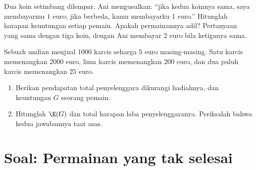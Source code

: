 \begin{exercise}[$\star\star$]\label{exo:g11:prob:10}
Dua koin setimbang dilempar. Ani mengusulkan: ``jika kedua koinnya sama, saya
membayarmu $1$ euro; jika berbeda, kamu membayarku $1$ euro.'' Hitunglah harapan
keuntungan setiap pemain. Apakah permainannya adil? Pertanyaan yang sama dengan
tiga koin, dengan Ani membayar $2$ euro bila ketiganya sama.
\end{exercise}

\begin{exercise}[$\star\star\star$]\label{exo:g11:prob:11}
Sebuah undian menjual $1000$ karcis seharga $5$ euro masing-masing. Satu karcis
memenangkan $2000$ euro, lima karcis memenangkan $200$ euro, dan dua puluh
karcis memenangkan $25$ euro.
\begin{enumerate}
  \item Berikan  pendapatan total penyelenggara dikurangi
        hadiahnya, dan  keuntungan $G$ seorang pemain.
  \item Hitunglah $\E(G)$ dan total harapan laba penyelenggaranya.
        Periksalah bahwa kedua jawabannya taat asas.
\end{enumerate}
\end{exercise}

\section{Soal: Permainan yang tak selesai}

